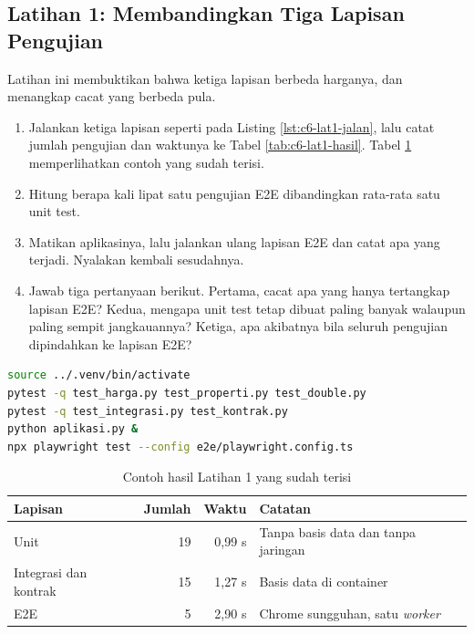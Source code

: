 \subsection*{Latihan 1: Membandingkan Tiga Lapisan Pengujian}

Latihan ini membuktikan bahwa ketiga lapisan berbeda harganya, dan menangkap
cacat yang berbeda pula.

\begin{enumerate}
  \item Jalankan ketiga lapisan seperti pada Listing
        \ref{lst:c6-lat1-jalan}, lalu catat jumlah pengujian dan waktunya ke
        Tabel \ref{tab:c6-lat1-hasil}. Tabel \ref{tab:c6-lat1-contoh}
        memperlihatkan contoh yang sudah terisi.
  \item Hitung berapa kali lipat satu pengujian E2E dibandingkan rata-rata
        satu unit test.
  \item Matikan aplikasinya, lalu jalankan ulang lapisan E2E dan catat apa
        yang terjadi. Nyalakan kembali sesudahnya.
  \item Jawab tiga pertanyaan berikut. Pertama, cacat apa yang hanya
        tertangkap lapisan E2E? Kedua, mengapa unit test tetap dibuat paling
        banyak walaupun paling sempit jangkauannya? Ketiga, apa akibatnya
        bila seluruh pengujian dipindahkan ke lapisan E2E?
\end{enumerate}

\begin{lstlisting}[language=bash, caption={Menjalankan ketiga lapisan pengujian, memakai \berkas{sources/chapter06/}}, label={lst:c6-lat1-jalan}]
source ../.venv/bin/activate
pytest -q test_harga.py test_properti.py test_double.py
pytest -q test_integrasi.py test_kontrak.py
python aplikasi.py &
npx playwright test --config e2e/playwright.config.ts
\end{lstlisting}

\begin{table}[!htb]
  \centering
  \caption{Contoh hasil Latihan 1 yang sudah terisi}
  \label{tab:c6-lat1-contoh}
  \begin{tabularx}{\textwidth}{lrrX}
    \hline
    \textbf{Lapisan} & \textbf{Jumlah} & \textbf{Waktu} & \textbf{Catatan} \\
    \hline
    Unit & 19 & 0,99 s & Tanpa basis data dan tanpa jaringan \\
    \hline
    Integrasi dan kontrak & 15 & 1,27 s & Basis data di container \\
    \hline
    E2E & 5 & 2,90 s & Chrome sungguhan, satu \textit{worker} \\
    \hline
  \end{tabularx}
\end{table}

